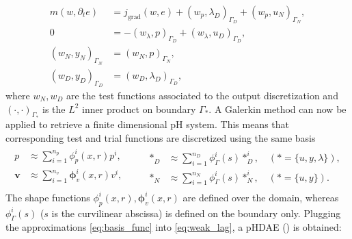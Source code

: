 \documentclass{ifacconf}
\begin{document}
\begin{equation}\label{eq:weak_lag}
\begin{aligned}
m(w, \partial_t{e}) &= j_{\text{grad}}(w, e) + \left(w_p, \lambda_D \right)_{\Gamma_D} + \left(w_p, u_N \right)_{\Gamma_N}, \\
0 &= - \left(w_\lambda, p \right)_{\Gamma_D} + \left(w_\lambda, u_D \right)_{\Gamma_D}, \\
\left(w_N, y_N \right)_{\Gamma_N} &= \left(w_N, p \right)_{\Gamma_N}, \\
\left(w_D, y_D \right)_{\Gamma_D} &= \left(w_D, \lambda_D \right)_{\Gamma_D}, 
\end{aligned}
\end{equation}
where $w_N, w_D$ are the test functions associated to the output discretization and $\left( \cdot, \cdot \right)_{\Gamma_{*}}$ is the $L^2$ inner product on boundary $\Gamma_*$. A Galerkin method can now be applied to retrieve a finite dimensional pH system. This means that corresponding test and trial functions are discretized using the same basis
\begin{equation}
\label{eq:basis_func}
\begin{aligned}
\begin{aligned}
p &\approx \sum_{i=1}^{n_p} \phi_p^i(x, r) p^i, \\
\bm{v} &\approx \sum_{i=1}^{n_v} \bm\phi_v^i(x, r) v^i, \\
\end{aligned} \qquad
\begin{aligned}
*_D &\approx \sum_{i=1}^{n_D} \phi^i_\Gamma(s) *^i_D, \quad (* = \{u, y, \lambda\}), \\
*_N &\approx \sum_{i=1}^{n_N} \phi_\Gamma^i(s) *^i_N, \quad (* = \{u,  y\}).
\end{aligned} 
\end{aligned}
\end{equation}
The shape functions $\phi_p^i(x, r), \bm\phi_v^i(x, r)$ are defined over the domain, whereas $\phi_\Gamma^i(s)$ ($s$ is the curvilinear abscissa) is defined on the boundary only. Plugging the approximations \eqref{eq:basis_func} into \eqref{eq:weak_lag}, a pHDAE (\cite{beattie2018linear}) is obtained:
\end{document}
